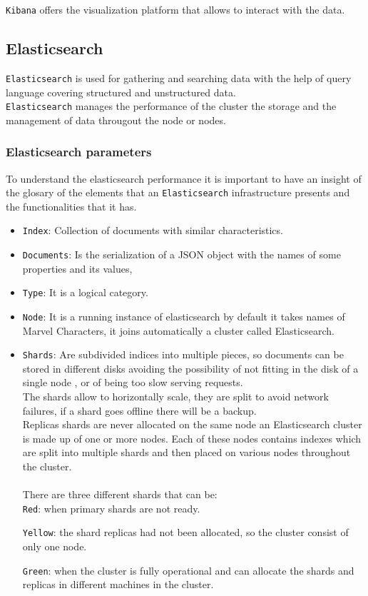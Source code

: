 \texttt{Kibana} offers the visualization platform that allows to interact with the data.

\subsection{Elasticsearch}
\texttt{Elasticsearch} is used for gathering and searching data with the help of query language covering structured and unstructured data. 
\\

\texttt{Elasticsearch} manages the performance of the cluster the storage and the management of data througout the node or nodes. 

\subsubsection{Elasticsearch parameters} To understand the elasticsearch performance it is important to have an insight of the glosary of the elements that an \texttt{Elasticsearch} infrastructure presents and the functionalities that it has.   
\begin{itemize}

\item \texttt{Index}: Collection of documents with similar characteristics.
\item \texttt{Documents}:  Is the serialization of a JSON object with the names of some properties and its values,
\item \texttt{Type}: It is a logical category.
\item \texttt{Node}: It is a running instance of elasticsearch by default it takes names of Marvel Characters, it  joins automatically a cluster called Elasticsearch.
\item \texttt{Shards}: Are subdivided indices into multiple pieces, so documents can be stored in different disks avoiding the possibility of not fitting in the disk of a single node , or of being too slow serving requests.
\\

The shards allow to horizontally scale, they are split to avoid network failures, if a shard goes offline there will be a backup.
\\

Replicas shards are never allocated on the same node an Elasticsearch cluster is made up of one or more nodes. Each of these nodes contains indexes which are split into multiple shards and then placed on various nodes throughout the cluster.\\
\\

There are three different shards that can be:\\

\texttt{Red}: when primary shards are not ready.

\texttt{Yellow}: the shard replicas had not been allocated, so the cluster consist of only one node.

\texttt{Green}: when the cluster is fully operational and can allocate the shards and replicas in different machines in the cluster.\\
\end{itemize}

